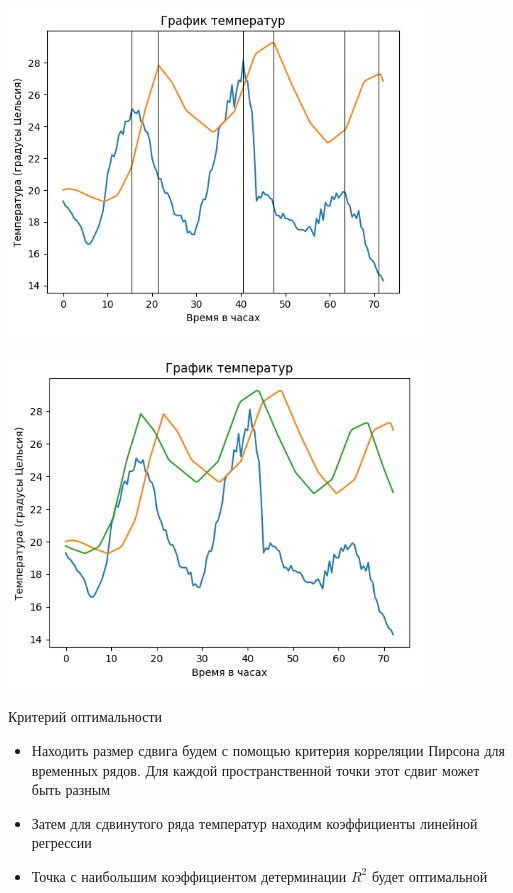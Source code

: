 \documentclass[14pt,aspectratio=169,hyperref={pdftex,unicode},xcolor=dvipsnames]{beamer}
\begin{document}
\begin{frame} \begin{center}
\includegraphics[width=11cm]{images/indent.png}
\end{center} \end{frame}
\begin{frame} \begin{center}
\includegraphics[width=11cm]{images/indent_2.png}
\end{center} \end{frame}



\begin{frame}{Критерий оптимальности}

\begin{itemize}
\item Находить размер сдвига будем с помощью критерия корреляции Пирсона для временных рядов. Для каждой пространственной точки этот сдвиг может быть разным
\item Затем для сдвинутого ряда температур находим коэффициенты линейной регрессии
\item Точка с наибольшим коэффициентом детерминации $R^2$ будет оптимальной
\end{itemize}

\end{frame}
\end{document}
